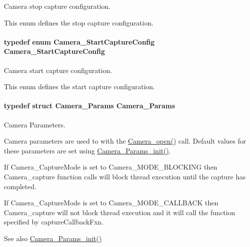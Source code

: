 Camera stop capture configuration. 

This enum defines the stop capture configuration. 
\paragraph[{Camera\+\_\+\+Start\+Capture\+Config}]{\setlength{\rightskip}{0pt plus 5cm}typedef enum {\bf Camera\+\_\+\+Start\+Capture\+Config}  {\bf Camera\+\_\+\+Start\+Capture\+Config}}\label{_camera_8h_a997e6ea5651105da0ee6f8f473e246dd}


Camera start capture configuration. 

This enum defines the start capture configuration. 
\paragraph[{Camera\+\_\+\+Params}]{\setlength{\rightskip}{0pt plus 5cm}typedef struct {\bf Camera\+\_\+\+Params}  {\bf Camera\+\_\+\+Params}}\label{_camera_8h_af493a9fc2ad7b908176dafd7dc39d167}


Camera Parameters. 

Camera parameters are used to with the \hyperlink{_camera_8h_a5bd1f515c97e0f598ff554c663bc6cde}{Camera\+\_\+open()} call. Default values for these parameters are set using \hyperlink{_camera_8h_a522620ae3e5fb202b1f46f5535619564}{Camera\+\_\+\+Params\+\_\+init()}.

If Camera\+\_\+\+Capture\+Mode is set to Camera\+\_\+\+M\+O\+D\+E\+\_\+\+B\+L\+O\+C\+K\+I\+N\+G then Camera\+\_\+capture function calls will block thread execution until the capture has completed.

If Camera\+\_\+\+Capture\+Mode is set to Camera\+\_\+\+M\+O\+D\+E\+\_\+\+C\+A\+L\+L\+B\+A\+C\+K then Camera\+\_\+capture will not block thread execution and it will call the function specified by capture\+Callback\+Fxn.

\begin{DoxySeeAlso}{See also}
\hyperlink{_camera_8h_a522620ae3e5fb202b1f46f5535619564}{Camera\+\_\+\+Params\+\_\+init()} 
\end{DoxySeeAlso}
